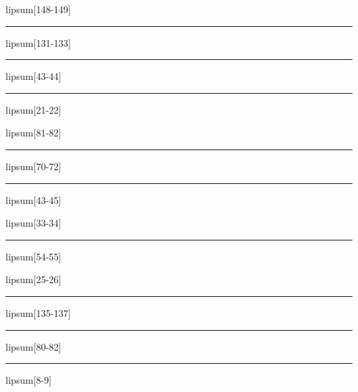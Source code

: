\documentclass[11pt,a4paper]{article}
\begin{document}
lipsum[148-149]

\begin{simplewrap}
  \textcolor{magenta!21}{\rule{5.9cm}{4.3cm}}
\end{simplewrap}
lipsum[131-133]

\begin{simplewrap}
  \textcolor{blue!15}{\rule{4.1cm}{4.3cm}}
\end{simplewrap}
lipsum[43-44]

\begin{simplewrap}
  \textcolor{brown!36}{\rule{4.9cm}{6.6cm}}
\end{simplewrap}
lipsum[21-22]

lipsum[81-82]

\begin{simplewrap}
  \textcolor{brown!51}{\rule{3.9cm}{4.1cm}}
\end{simplewrap}
lipsum[70-72]

\begin{simplewrap}
  \textcolor{lime!57}{\rule{4.8cm}{9.7cm}}
\end{simplewrap}
lipsum[43-45]

lipsum[33-34]

\begin{simplewrap}
  \textcolor{magenta!52}{\rule{3.8cm}{8.0cm}}
\end{simplewrap}
lipsum[54-55]

lipsum[25-26]

\begin{simplewrap}
  \textcolor{green!40}{\rule{4.6cm}{2.2cm}}
\end{simplewrap}
lipsum[135-137]

\begin{simplewrap}
  \textcolor{green!16}{\rule{3.8cm}{3.2cm}}
\end{simplewrap}
lipsum[80-82]

\begin{simplewrap}
  \textcolor{violet!38}{\rule{4.9cm}{3.1cm}}
\end{simplewrap}
lipsum[8-9]
\end{document}
